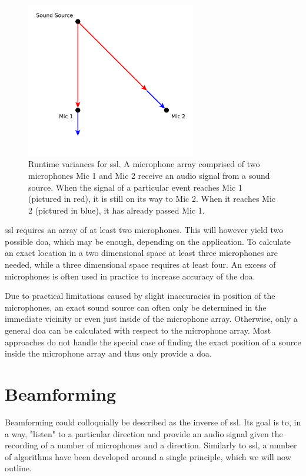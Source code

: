 \begin{figure}[]
	\centering
	\includegraphics[width=0.66\textwidth]{diagrams/basics_ssl.pdf}
	\caption{Runtime variances for \gls{ssl}.
		A microphone array comprised of two microphones Mic 1 and Mic 2 receive an audio signal from a sound source.
		When the signal of a particular event reaches Mic 1 (pictured in red), it is still on its way to Mic 2.
		When it reaches Mic 2 (pictured in blue), it has already passed Mic 1.}
	\label{pic:basics:ssl}
\end{figure}

\gls{ssl} requires an array of at least two microphones.
This will however yield two possible \gls{doa}, which may be enough, depending on the application.
To calculate an exact location in a two dimensional space at least three microphones are needed, while a three dimensional space requires at least four.
An excess of microphones is often used in practice to increase accuracy of the \gls{doa}.

Due to practical limitations caused by slight inaccuracies in position of the microphones, an exact sound source can often only be determined in the immediate vicinity or even just inside of the microphone array.
Otherwise, only a general \gls{doa} can be calculated with respect to the microphone array.
Most approaches do not handle the special case of finding the exact position of a source inside the microphone array and thus only provide a \gls{doa}.

\section{Beamforming}
Beamforming could colloquially be described as the inverse of \gls{ssl}.
Its goal is to, in a way, "listen" to a particular direction and provide an audio signal given the recording of a number of microphones and a direction.
Similarly to \gls{ssl}, a number of algorithms have been developed around a single principle, which we will now outline.

